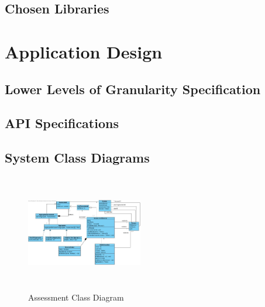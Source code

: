 \documentclass[12pt]{article}
\begin{document}
			\vspace{0.2in}
			
		
		\subsection{Chosen Libraries}
			\vspace{0.2in}

			
	\section{Application Design}
			\vspace{0.2in}
					
		\subsection{Lower Levels of Granularity Specification}
				
		\vspace{0.2in}
		
		\subsection{API Specifications}
				\vspace{0.2in}
				
		\subsection{System Class Diagrams }%
				
				\begin{figure}[h]
						\centering
						\includegraphics[width=2in, height=2in]{Pictures/MiniPhase2ClassDiag.jpg}
						\caption{Assessment Class Diagram}
				\end{figure}
						
\end{document}
